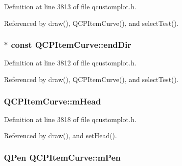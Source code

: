 Definition at line 3813 of file qcustomplot.\+h.



Referenced by draw(), Q\+C\+P\+Item\+Curve(), and select\+Test().

\hypertarget{class_q_c_p_item_curve_a28181a9dee9cc3c3da83a883221bd2d0}{}
\subsubsection[{end\+Dir}]{$\ast$ const Q\+C\+P\+Item\+Curve\+::end\+Dir}\label{class_q_c_p_item_curve_a28181a9dee9cc3c3da83a883221bd2d0}


Definition at line 3812 of file qcustomplot.\+h.



Referenced by draw(), Q\+C\+P\+Item\+Curve(), and select\+Test().

\hypertarget{class_q_c_p_item_curve_af2cc26ff199570940dc96f5ec19a13f8}{}
\subsubsection[{m\+Head}]{ Q\+C\+P\+Item\+Curve\+::m\+Head\hspace{0.3cm}{\ttfamily [protected]}}\label{class_q_c_p_item_curve_af2cc26ff199570940dc96f5ec19a13f8}


Definition at line 3818 of file qcustomplot.\+h.



Referenced by draw(), and set\+Head().

\hypertarget{class_q_c_p_item_curve_a7ef92988d1db2e4d0311e34c0a57fe42}{}
\subsubsection[{m\+Pen}]{\setlength{\rightskip}{0pt plus 5cm}Q\+Pen Q\+C\+P\+Item\+Curve\+::m\+Pen\hspace{0.3cm}{\ttfamily [protected]}}\label{class_q_c_p_item_curve_a7ef92988d1db2e4d0311e34c0a57fe42}


